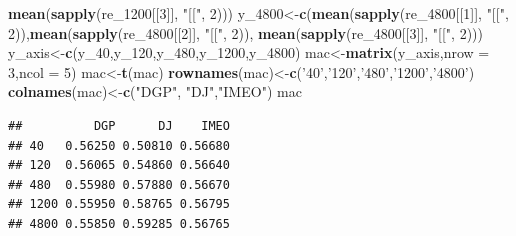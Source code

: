 \documentclass[
]{article}
\newenvironment{Shaded}{\begin{snugshade}}{\end{snugshade}}
\newcommand{\DataTypeTok}[1]{\textcolor[rgb]{0.13,0.29,0.53}{#1}}
\newcommand{\DecValTok}[1]{\textcolor[rgb]{0.00,0.00,0.81}{#1}}
\newcommand{\KeywordTok}[1]{\textcolor[rgb]{0.13,0.29,0.53}{\textbf{#1}}}
\newcommand{\NormalTok}[1]{#1}
\newcommand{\StringTok}[1]{\textcolor[rgb]{0.31,0.60,0.02}{#1}}
\begin{document}
\begin{Shaded}
\begin{Highlighting}[]
        \KeywordTok{mean}\NormalTok{(}\KeywordTok{sapply}\NormalTok{(re_}\DecValTok{1200}\NormalTok{[[}\DecValTok{3}\NormalTok{]], }\StringTok{"[["}\NormalTok{, }\DecValTok{2}\NormalTok{)))}
\NormalTok{y_}\DecValTok{4800}\NormalTok{<-}\KeywordTok{c}\NormalTok{(}\KeywordTok{mean}\NormalTok{(}\KeywordTok{sapply}\NormalTok{(re_}\DecValTok{4800}\NormalTok{[[}\DecValTok{1}\NormalTok{]], }\StringTok{"[["}\NormalTok{, }\DecValTok{2}\NormalTok{)),}\KeywordTok{mean}\NormalTok{(}\KeywordTok{sapply}\NormalTok{(re_}\DecValTok{4800}\NormalTok{[[}\DecValTok{2}\NormalTok{]], }\StringTok{"[["}\NormalTok{, }\DecValTok{2}\NormalTok{)),}
        \KeywordTok{mean}\NormalTok{(}\KeywordTok{sapply}\NormalTok{(re_}\DecValTok{4800}\NormalTok{[[}\DecValTok{3}\NormalTok{]], }\StringTok{"[["}\NormalTok{, }\DecValTok{2}\NormalTok{)))}
\NormalTok{y_axis<-}\KeywordTok{c}\NormalTok{(y_}\DecValTok{40}\NormalTok{,y_}\DecValTok{120}\NormalTok{,y_}\DecValTok{480}\NormalTok{,y_}\DecValTok{1200}\NormalTok{,y_}\DecValTok{4800}\NormalTok{)}
\NormalTok{mac<-}\KeywordTok{matrix}\NormalTok{(y_axis,}\DataTypeTok{nrow =} \DecValTok{3}\NormalTok{,}\DataTypeTok{ncol =} \DecValTok{5}\NormalTok{)}
\NormalTok{mac<-}\KeywordTok{t}\NormalTok{(mac)}
\KeywordTok{rownames}\NormalTok{(mac)<-}\KeywordTok{c}\NormalTok{(}\StringTok{'40'}\NormalTok{,}\StringTok{'120'}\NormalTok{,}\StringTok{'480'}\NormalTok{,}\StringTok{'1200'}\NormalTok{,}\StringTok{'4800'}\NormalTok{)}
\KeywordTok{colnames}\NormalTok{(mac)<-}\KeywordTok{c}\NormalTok{(}\StringTok{"DGP"}\NormalTok{, }\StringTok{"DJ"}\NormalTok{,}\StringTok{"IMEO"}\NormalTok{)}
\NormalTok{mac}
\end{Highlighting}
\end{Shaded}

\begin{verbatim}
##          DGP      DJ    IMEO
## 40   0.56250 0.50810 0.56680
## 120  0.56065 0.54860 0.56640
## 480  0.55980 0.57880 0.56670
## 1200 0.55950 0.58765 0.56795
## 4800 0.55850 0.59285 0.56765
\end{verbatim}
\end{document}
